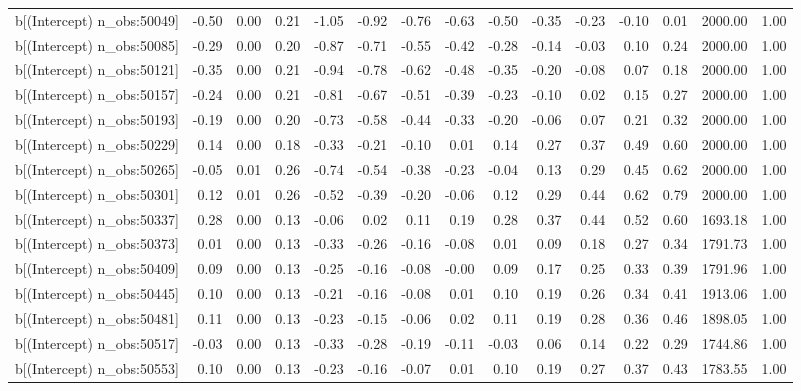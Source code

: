 \begin{table}[ht]
\begin{tabular}{rrrrrrrrrrrrrrr}
  b[(Intercept) n\_obs:50049] & -0.50 & 0.00 & 0.21 & -1.05 & -0.92 & -0.76 & -0.63 & -0.50 & -0.35 & -0.23 & -0.10 & 0.01 & 2000.00 & 1.00 \\ 
  b[(Intercept) n\_obs:50085] & -0.29 & 0.00 & 0.20 & -0.87 & -0.71 & -0.55 & -0.42 & -0.28 & -0.14 & -0.03 & 0.10 & 0.24 & 2000.00 & 1.00 \\ 
  b[(Intercept) n\_obs:50121] & -0.35 & 0.00 & 0.21 & -0.94 & -0.78 & -0.62 & -0.48 & -0.35 & -0.20 & -0.08 & 0.07 & 0.18 & 2000.00 & 1.00 \\ 
  b[(Intercept) n\_obs:50157] & -0.24 & 0.00 & 0.21 & -0.81 & -0.67 & -0.51 & -0.39 & -0.23 & -0.10 & 0.02 & 0.15 & 0.27 & 2000.00 & 1.00 \\ 
  b[(Intercept) n\_obs:50193] & -0.19 & 0.00 & 0.20 & -0.73 & -0.58 & -0.44 & -0.33 & -0.20 & -0.06 & 0.07 & 0.21 & 0.32 & 2000.00 & 1.00 \\ 
  b[(Intercept) n\_obs:50229] & 0.14 & 0.00 & 0.18 & -0.33 & -0.21 & -0.10 & 0.01 & 0.14 & 0.27 & 0.37 & 0.49 & 0.60 & 2000.00 & 1.00 \\ 
  b[(Intercept) n\_obs:50265] & -0.05 & 0.01 & 0.26 & -0.74 & -0.54 & -0.38 & -0.23 & -0.04 & 0.13 & 0.29 & 0.45 & 0.62 & 2000.00 & 1.00 \\ 
  b[(Intercept) n\_obs:50301] & 0.12 & 0.01 & 0.26 & -0.52 & -0.39 & -0.20 & -0.06 & 0.12 & 0.29 & 0.44 & 0.62 & 0.79 & 2000.00 & 1.00 \\ 
  b[(Intercept) n\_obs:50337] & 0.28 & 0.00 & 0.13 & -0.06 & 0.02 & 0.11 & 0.19 & 0.28 & 0.37 & 0.44 & 0.52 & 0.60 & 1693.18 & 1.00 \\ 
  b[(Intercept) n\_obs:50373] & 0.01 & 0.00 & 0.13 & -0.33 & -0.26 & -0.16 & -0.08 & 0.01 & 0.09 & 0.18 & 0.27 & 0.34 & 1791.73 & 1.00 \\ 
  b[(Intercept) n\_obs:50409] & 0.09 & 0.00 & 0.13 & -0.25 & -0.16 & -0.08 & -0.00 & 0.09 & 0.17 & 0.25 & 0.33 & 0.39 & 1791.96 & 1.00 \\ 
  b[(Intercept) n\_obs:50445] & 0.10 & 0.00 & 0.13 & -0.21 & -0.16 & -0.08 & 0.01 & 0.10 & 0.19 & 0.26 & 0.34 & 0.41 & 1913.06 & 1.00 \\ 
  b[(Intercept) n\_obs:50481] & 0.11 & 0.00 & 0.13 & -0.23 & -0.15 & -0.06 & 0.02 & 0.11 & 0.19 & 0.28 & 0.36 & 0.46 & 1898.05 & 1.00 \\ 
  b[(Intercept) n\_obs:50517] & -0.03 & 0.00 & 0.13 & -0.33 & -0.28 & -0.19 & -0.11 & -0.03 & 0.06 & 0.14 & 0.22 & 0.29 & 1744.86 & 1.00 \\ 
  b[(Intercept) n\_obs:50553] & 0.10 & 0.00 & 0.13 & -0.23 & -0.16 & -0.07 & 0.01 & 0.10 & 0.19 & 0.27 & 0.37 & 0.43 & 1783.55 & 1.00 \\ 

\end{tabular}
\end{table}
